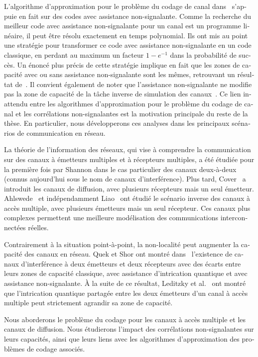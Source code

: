 \begin{otherlanguage}{french}
L'algorithme d'approximation pour le problème du codage de canal dans~\cite{BF18} s'appuie en fait sur des codes avec assistance non-signalante. Comme la recherche du meilleur code avec assistance non-signalante pour un canal est un programme linéaire, il peut être résolu exactement en temps polynomial. Ils ont mis au point une stratégie pour transformer ce code avec assistance non-signalante en un code classique, en perdant au maximum un facteur $1-e^{-1}$ dans la probabilité de succès. Un énoncé plus précis de cette stratégie implique en fait que les zones de capacité avec ou sans assistance non-signalante sont les mêmes, retrouvant un résultat de~\cite{Matthews12}. Il convient également de noter que l'assistance non-signalante ne modifie pas la zone de capacité de la tâche inverse de simulation des canaux~\cite{CRBT22}. Ce lien inattendu entre les algorithmes d'approximation pour le problème du codage de canal et les corrélations non-signalantes est la motivation principale du reste de la thèse. En particulier, nous développerons ces analyses dans les principaux scénarios de communication en réseau.

La théorie de l'information des réseaux, qui vise à comprendre la communication sur des canaux à émetteurs multiples et à récepteurs multiples, a été étudiée pour la première fois par Shannon dans le cas particulier des canaux deux-à-deux\cite{Shannon61} (connus aujourd'hui sous le nom de canaux d'interférence). Plus tard, Cover~\cite{Cover72} a introduit les canaux de diffusion, avec plusieurs récepteurs mais un seul émetteur. Ahlswede~\cite{Ahlswede73} et indépendamment Liao~\cite{Liao73} ont étudié le scénario inverse des canaux à accès multiple, avec plusieurs émetteurs mais un seul récepteur. Ces canaux plus complexes permettent une meilleure modélisation des communications interconnectées réelles.

Contrairement à la situation point-à-point, la non-localité peut augmenter la capacité des canaux en réseau. Quek et Shor ont montré dans~\cite{QS17} l'existence de canaux d'interférence à deux émetteurs et deux récepteurs avec des écarts entre leurs zones de capacité classique, avec assistance d'intrication quantique et avec assistance non-signalante. À la suite de ce résultat, Leditzky et al.~\cite{LALS20,SLSS22} ont montré que l'intrication quantique partagée entre les deux émetteurs d'un canal à accès multiple peut strictement agrandir sa zone de capacité.

Nous aborderons le problème du codage pour les canaux à accès multiple et les canaux de diffusion. Nous étudierons l'impact des corrélations non-signalantes sur leurs capacités, ainsi que leurs liens avec les algorithmes d'approximation des problèmes de codage associés.


\end{otherlanguage}
